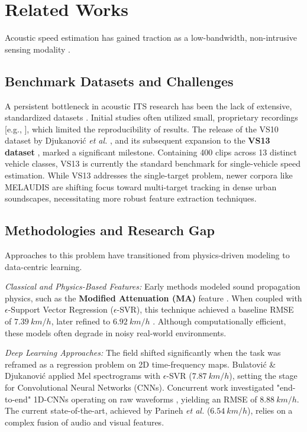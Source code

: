 \documentclass[conference]{IEEEtran}
\begin{document}
\section{Related Works}
Acoustic speed estimation has gained traction as a low-bandwidth, non-intrusive sensing modality \cite{ref1, ref3}.

\subsection{Benchmark Datasets and Challenges}
A persistent bottleneck in acoustic ITS research has been the lack of extensive, standardized datasets \cite{ref3, ref4}. Initial studies often utilized small, proprietary recordings [e.g., \cite{ref1, ref4}], which limited the reproducibility of results. The release of the VS10 dataset by Djukanović \textit{et al.} \cite{ref5}, and its subsequent expansion to the \textbf{VS13 dataset} \cite{ref6, ref7}, marked a significant milestone. Containing 400 clips across 13 distinct vehicle classes, VS13 is currently the standard benchmark for single-vehicle speed estimation. While VS13 addresses the single-target problem, newer corpora like MELAUDIS \cite{ref8} are shifting focus toward multi-target tracking in dense urban soundscapes, necessitating more robust feature extraction techniques.

\subsection{Methodologies and Research Gap}
Approaches to this problem have transitioned from physics-driven modeling to data-centric learning.

\textit{Classical and Physics-Based Features:} Early methods modeled sound propagation physics, such as the \textbf{Modified Attenuation (MA)} feature \cite{ref5}. When coupled with $\epsilon$-Support Vector Regression ($\epsilon$-SVR), this technique achieved a baseline RMSE of $7.39~km/h$, later refined to $6.92~km/h$ \cite{ref13}. Although computationally efficient, these models often degrade in noisy real-world environments.

\textit{Deep Learning Approaches:} The field shifted significantly when the task was reframed as a regression problem on 2D time-frequency maps. Bulatović \& Djukanović \cite{ref9} applied Mel spectrograms with $\epsilon$-SVR ($7.87~km/h$), setting the stage for Convolutional Neural Networks (CNNs). Concurrent work investigated "end-to-end" 1D-CNNs operating on raw waveforms \cite{ref4}, yielding an RMSE of $8.88~km/h$. The current state-of-the-art, achieved by Parineh \textit{et al.} \cite{ref10} ($6.54~km/h$), relies on a complex fusion of audio and visual features.
\end{document}
